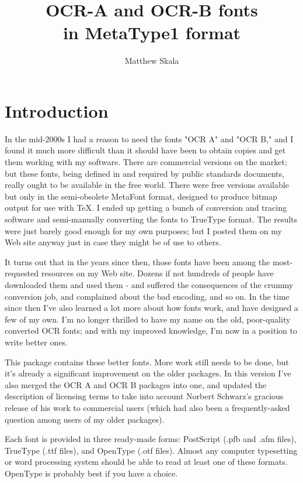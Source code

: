 \documentclass{article}
\title{OCR-A and OCR-B fonts\\in MetaType1 format}
\author{Matthew Skala}
\begin{document}
\setmainfont{OCRB.otf}
\setmonofont{OCRB.otf}

\maketitle

\section{Introduction}

In the mid-2000s I had a reason to need the fonts "OCR A" and "OCR B," and I
found it much more difficult than it should have been to obtain copies and
get them working with my software.  There are commercial versions on the
market; but these fonts, being defined in and required by public standards
documents, really ought to be available in the free world.  There were free
versions available but only in the semi-obsolete MetaFont format, designed
to produce bitmap output for use with TeX\@.  I ended up getting a bunch of
conversion and tracing software and semi-manually converting the fonts to
TrueType format.  The results were just barely good enough for my own
purposes; but I posted them on my Web site anyway just in case they might be
of use to others.

It turns out that in the years since then, those fonts have been among the
most-requested resources on my Web site.  Dozens if not hundreds of people
have downloaded them and used them - and suffered the consequences of the
crummy conversion job, and complained about the bad encoding, and so on.  In
the time since then I've also learned a lot more about how fonts work, and
have designed a few of my own.  I'm no longer thrilled to have my name on
the old, poor-quality converted OCR fonts; and with my improved knowledge,
I'm now in a position to write better ones.

This package contains those better fonts.  More work still needs to be done,
but it's already a significant improvement on the older packages.  In this
version I've also merged the OCR A and OCR B packages into one, and updated
the description of licensing terms to take into account Norbert Schwarz's
gracious release of his work to commercial users (which had also been a
frequently-asked question among users of my older packages).

Each font is provided in three ready-made forms:  PostScript (.pfb and .afm
files), TrueType (.ttf files), and OpenType (.otf files).  Almost any
computer typesetting or word processing system should be able to read at
least one of these formats.  OpenType is probably best if you have a choice.
\end{document}
